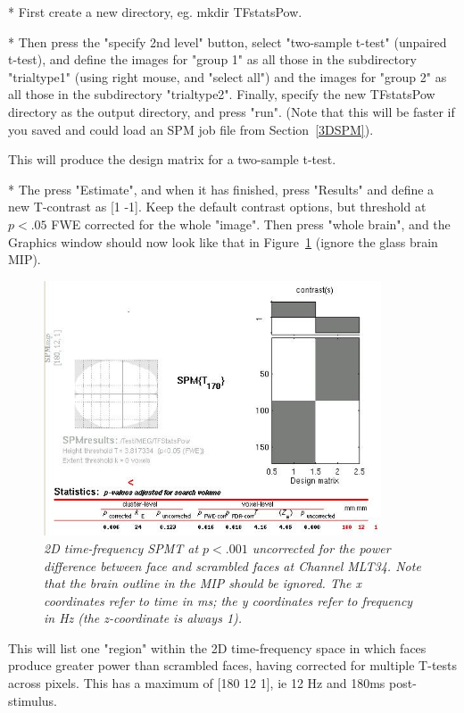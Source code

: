 * First create a new directory, eg. mkdir TFstatsPow.

* Then press the "specify 2nd level" button,  select "two-sample t-test" (unpaired t-test), and define the images for "group 1" as all those in the subdirectory "trialtype1" (using right mouse, and "select all") and the images for "group 2" as all those in the subdirectory "trialtype2". Finally, specify the new TFstatsPow directory as the output directory, and press "run". (Note that this will be faster if you saved and could load an SPM job file from Section~\ref{3DSPM}).

This will produce the design matrix for a two-sample t-test.

* The press "Estimate", and when it has finished, press "Results" and define a new T-contrast as [1 -1]. Keep the default contrast options, but threshold at $p<.05$ FWE corrected for the whole "image". Then press "whole brain", and the Graphics window should now look like that in Figure~\ref{fig_32_16} (ignore the glass brain MIP).


\begin{figure}
\begin{center}
\includegraphics[width=100mm]{multimodal/figures/figure_32_16}
\caption{\em  2D time-frequency SPM{T} at $p<.001$ uncorrected for the power difference between face and scrambled faces at Channel MLT34. Note that the brain outline in the MIP should be ignored. The x  coordinates refer to time in ms; the y coordinates refer to frequency in Hz (the z-coordinate is always 1).\label{fig_32_16}}
\end{center}
\end{figure}

This will list one "region" within the 2D time-frequency space in which faces produce greater power than scrambled faces, having corrected for multiple T-tests across pixels. This has a maximum of  [180 12 1], ie 12 Hz and 180ms post-stimulus.

